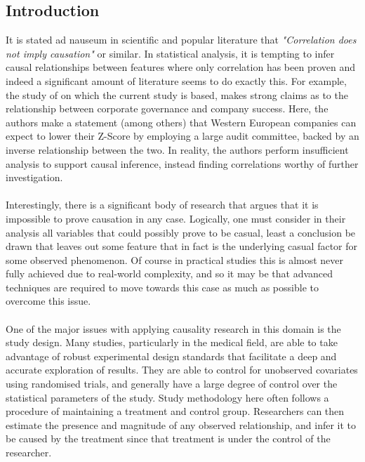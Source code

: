 \subsection{Introduction}
{It is stated ad nauseum in scientific and popular literature that {\it "Correlation does not imply causation"} or similar. In statistical analysis, it is tempting to infer causal relationships between features where only correlation has been proven and indeed a significant amount of literature seems to do exactly this. For example, the study of \cite{moldovan2015learning} on which the current study is based, makes strong claims as to the relationship between corporate governance and company success. Here, the authors make a statement (among others) that Western European companies can expect to lower their Z-Score by employing a large audit committee, backed by an inverse relationship between the two. In reality, the authors perform insufficient analysis to support causal inference, instead finding correlations worthy of further investigation. \\\\
Interestingly, there is a significant body of research that argues that it is impossible to prove causation in any case. Logically, one must consider in their analysis all variables that could possibly prove to be casual, least a conclusion be drawn that leaves out some feature that in fact is the underlying casual factor for some observed phenomenon. Of course in practical studies this is almost never fully achieved due to real-world complexity, and so it may be that advanced techniques are required to move towards this case as much as possible to overcome this issue.  \\\\
One of the major issues with applying causality research in this domain is the study design. Many studies, particularly in the medical field, are able to take advantage of robust experimental design standards that facilitate a deep and accurate exploration of results. They are able to control for unobserved covariates using randomised trials, and generally have a large degree of control over the statistical parameters of the study. Study methodology here often follows a procedure of maintaining a treatment and control group. Researchers can then estimate the presence and magnitude of any observed relationship, and infer it to be caused by the treatment since that treatment is under the control of the researcher.  \\\\
}
